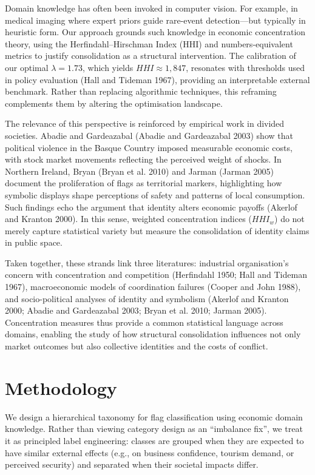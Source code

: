 \documentclass[
  a4paper,
]{article}
\begin{document}
Domain knowledge has often been invoked in computer vision. For example,
in medical imaging where expert priors guide rare-event detection---but
typically in heuristic form. Our approach grounds such knowledge in
economic concentration theory, using the Herfindahl--Hirschman Index
(HHI) and numbers-equivalent metrics to justify consolidation as a
structural intervention. The calibration of our optimal
\(\lambda=1.73\), which yields \(HHI\approx1{,}847\), resonates with
thresholds used in policy evaluation (Hall and Tideman 1967), providing
an interpretable external benchmark. Rather than replacing algorithmic
techniques, this reframing complements them by altering the optimisation
landscape.

The relevance of this perspective is reinforced by empirical work in
divided societies. Abadie and Gardeazabal (Abadie and Gardeazabal 2003)
show that political violence in the Basque Country imposed measurable
economic costs, with stock market movements reflecting the perceived
weight of shocks. In Northern Ireland, Bryan (Bryan et al. 2010) and
Jarman (Jarman 2005) document the proliferation of flags as territorial
markers, highlighting how symbolic displays shape perceptions of safety
and patterns of local consumption. Such findings echo the argument that
identity alters economic payoffs (Akerlof and Kranton 2000). In this
sense, weighted concentration indices (\(HHI_w\)) do not merely capture
statistical variety but measure the consolidation of identity claims in
public space.

Taken together, these strands link three literatures: industrial
organisation's concern with concentration and competition (Herfindahl
1950; Hall and Tideman 1967), macroeconomic models of coordination
failures (Cooper and John 1988), and socio-political analyses of
identity and symbolism (Akerlof and Kranton 2000; Abadie and Gardeazabal
2003; Bryan et al. 2010; Jarman 2005). Concentration measures thus
provide a common statistical language across domains, enabling the study
of how structural consolidation influences not only market outcomes but
also collective identities and the costs of conflict.

\section{Methodology}\label{sec-methodology}

We design a hierarchical taxonomy for flag classification using economic
domain knowledge. Rather than viewing category design as an ``imbalance
fix'', we treat it as principled label engineering: classes are grouped
when they are expected to have similar external effects (e.g., on
business confidence, tourism demand, or perceived security) and
separated when their societal impacts differ.
\end{document}
